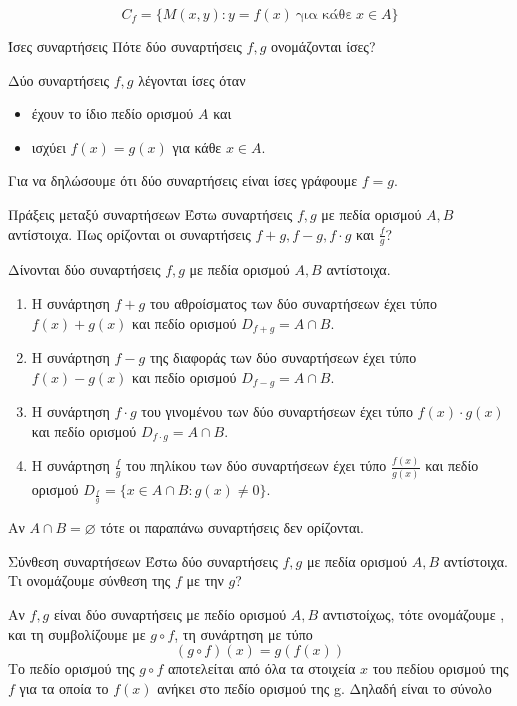 \[ C_f=\{M(x,y):y=f(x)\ \textrm{για κάθε}\ x\in A\} \]
\begin{Orismosbox}{Ίσες συναρτήσεις}
\label{orismos:ises_synarthseis}
Πότε δύο συναρτήσεις $f,g$ ονομάζονται ίσες?
\end{Orismosbox}\apanthsh
Δύο συναρτήσεις $ f,g $ λέγονται ίσες όταν
\begin{itemize}
\item έχουν το ίδιο πεδίο ορισμού $ A $ και
\item ισχύει $ f(x)=g(x) $ για κάθε $ x\in A $.
\end{itemize}
Για να δηλώσουμε ότι δύο συναρτήσεις είναι ίσες γράφουμε $ f=g $.
\begin{Orismosbox}{Πράξεις μεταξύ συναρτήσεων}
\label{orismos:praxeis_synarthsewn}
Έστω συναρτήσεις $ f,g $ με πεδία ορισμού $ A,B $ αντίστοιχα. Πως ορίζονται οι συναρτήσεις $f+g, f-g,f\cdot g$ και $\frac{f}{g}$?
\end{Orismosbox}
\apanthsh
Δίνονται δύο συναρτήσεις $ f,g $ με πεδία ορισμού $ A,B $ αντίστοιχα. 
\begin{enumerate}
\item Η συνάρτηση $ f+g $ του αθροίσματος των δύο συναρτήσεων έχει τύπο $ f(x)+g(x) $ και πεδίο ορισμού $ D_{f+g}=A\cap B $.
\item Η συνάρτηση $ f-g $ της διαφοράς των δύο συναρτήσεων έχει τύπο $ f(x)-g(x) $ και πεδίο ορισμού $ D_{f-g}=A\cap B $.
\item Η συνάρτηση $ f\cdot g $ του γινομένου των δύο συναρτήσεων έχει τύπο $ f(x)\cdot g(x) $ και πεδίο ορισμού $ D_{f\cdot g}=A\cap B $.
\item Η συνάρτηση $ \frac{f}{g} $ του πηλίκου των δύο συναρτήσεων έχει τύπο $ \frac{f(x)}{g(x)} $ και πεδίο ορισμού $ D_{\frac{f}{g}}=\{x\in A\cap B:g(x)\neq 0\} $.
\end{enumerate}
Αν $ A\cap B=\varnothing $ τότε οι παραπάνω συναρτήσεις δεν ορίζονται.
\begin{Orismosbox}{Σύνθεση συναρτήσεων}
\label{orismos:synthesh_synarthsewn}
Έστω δύο συναρτήσεις $f, g$ με πεδία ορισμού $A,B$ αντίστοιχα. Τι ονομάζουμε σύνθεση της
$f$ με την $g$?
\end{Orismosbox}
\apanthsh
Αν $f, g$ είναι δύο συναρτήσεις με πεδίο ορισμού $A,B$ αντιστοίχως, τότε ονομάζουμε , και τη συμβολίζουμε με $g\circ f$, τη συνάρτηση με τύπο
\[ (g\circ f)(x)=g(f(x))\]
Το πεδίο ορισμού της $g\circ f$ αποτελείται από όλα τα στοιχεία $x$ του πεδίου ορισμού της $f$ για τα οποία το $f(x)$ ανήκει στο πεδίο ορισμού της g. Δηλαδή είναι το σύνολο
